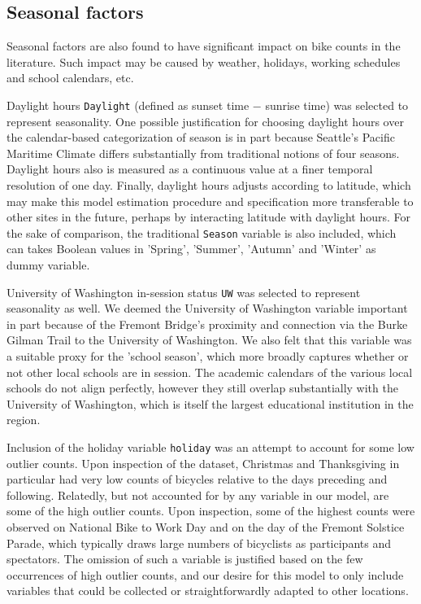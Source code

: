 \documentclass [11pt, proquest] {uwthesis}[2015/03/03]
\begin{document}
\subsection{Seasonal factors}
Seasonal factors are also found to have significant impact on bike counts in the literature. Such impact may be caused by weather, holidays, working schedules and school calendars, etc.

Daylight hours \texttt{Daylight} (defined as sunset time $-$ sunrise time) was selected to represent seasonality. One possible justification for choosing daylight hours over the calendar-based categorization of season is in part because Seattle’s Pacific Maritime Climate differs substantially from traditional notions of four seasons. Daylight hours also is measured as a continuous value at a finer temporal resolution of one day. Finally, daylight hours adjusts according to latitude, which may make this model estimation procedure and specification more transferable to other sites in the future, perhaps by interacting latitude with daylight hours. For the sake of comparison, the traditional \texttt{Season} variable is also included, which can takes Boolean values in 'Spring', 'Summer', 'Autumn' and 'Winter' as dummy variable.

University of Washington in-session status \texttt{UW} was selected to represent seasonality as well. We deemed the University of Washington variable important in part because of the Fremont Bridge's proximity and connection via the Burke Gilman Trail to the University of Washington. We also felt that this variable was a suitable proxy for the 'school season', which more broadly captures whether or not other local schools are in session. The academic calendars of the various local schools do not align perfectly, however they still overlap substantially with the University of Washington, which is itself the largest educational institution in the region.

Inclusion of the holiday variable \texttt{holiday} was an attempt to account for some low outlier counts. Upon inspection of the dataset, Christmas and Thanksgiving in particular had very low counts of bicycles relative to the days preceding and following. Relatedly, but not accounted for by any variable in our model, are some of the high outlier counts. Upon inspection, some of the highest counts were observed on National Bike to Work Day and on the day of the Fremont Solstice Parade, which typically draws large numbers of bicyclists as participants and spectators. The omission of such a variable is justified based on the few occurrences of high outlier counts, and our desire for this model to only include variables that could be collected or straightforwardly adapted to other locations.
\end{document}
